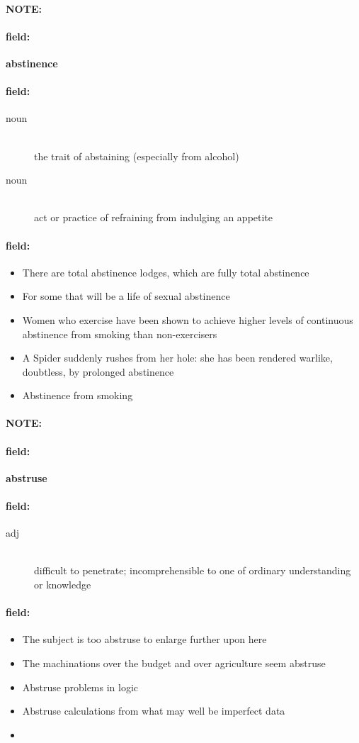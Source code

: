 \documentclass[12pt]{article}
\newenvironment{note}{\paragraph{NOTE:}}{}
\newenvironment{field}{\paragraph{field:}}{}
\begin{document}
\begin{note}
\begin{field}
\textbf{\large abstinence}
\end{field}


\begin{field}
\begin{description}
\item[noun] \hfill \\ 
the trait of abstaining (especially from alcohol)

\item[noun] \hfill \\ 
act or practice of refraining from indulging an appetite

\end{description}
\end{field}

\begin{field}
\begin{itemize}
\item There are total abstinence lodges, which are fully total abstinence
\item For some that will be a life of sexual abstinence
\item Women who exercise have been shown to achieve higher levels of continuous abstinence from smoking than non-exercisers
\item A Spider suddenly rushes from her hole: she has been rendered warlike, doubtless, by prolonged abstinence
\item Abstinence from smoking
\end{itemize}
\end{field}
\end{note}
\begin{note}
\begin{field}
\textbf{\large abstruse}
\end{field}


\begin{field}
\begin{description}
\item[adj] \hfill \\ 
difficult to penetrate; incomprehensible to one of ordinary understanding or knowledge

\end{description}
\end{field}

\begin{field}
\begin{itemize}
\item The subject is too abstruse to enlarge further upon here
\item The machinations over the budget and over agriculture seem abstruse
\item Abstruse problems in logic
\item Abstruse calculations from what may well be imperfect data
\item 
\end{itemize}
\end{field}
\end{note}
\end{document}
